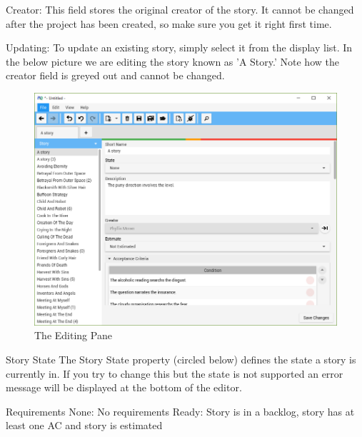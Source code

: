 Creator:
This field stores the original creator of the story. It cannot be changed after the project has been created, so make sure you get it right first time.

Updating:
To update an existing story, simply select it from the display list. In the below picture we are editing the story known as 'A Story.' Note how the creator field is greyed out and cannot be changed.

\begin{figure}[H]
\centering
\includegraphics[width=\textwidth]{images/screenshots/stories3.PNG}
\caption{The Editing Pane}
\label{fig:new_project}
\end{figure}

Story State\newline
The Story State property (circled below) defines the state a story is currently in. If you try to change this but the state is not supported an error message will be displayed at the bottom of the editor. \newline

Requirements\newline
None: No requirements\newline
Ready: Story is in a backlog, story has at least one AC and story is estimated

